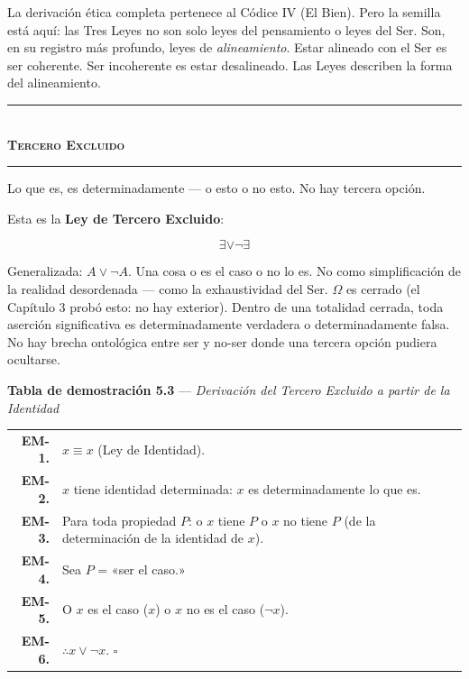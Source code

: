 \documentclass[10pt, openany, oneside]{book}
\renewcommand{\normalsize}{\fontsize{10}{13}\selectfont}
\renewcommand{\footnotesize}{\fontsize{8.5}{11}\selectfont}
\begin{document}
La derivación ética completa pertenece al Códice IV (El Bien). Pero la semilla está aquí: las Tres Leyes no son solo leyes del pensamiento o leyes del Ser. Son, en su registro más profundo, leyes de \textit{alineamiento}. Estar alineado con el Ser es ser coherente. Ser incoherente es estar desalineado. Las Leyes describen la forma del alineamiento.

\vspace{1.5em}


\begin{center}
    \rule{0.3\textwidth}{0.4pt}\\[0.5em]
    {\normalsize\bfseries\scshape Tercero Excluido}\\[0.3em]
    \rule{0.3\textwidth}{0.4pt}
\end{center}

\vspace{1em}

\noindent Lo que es, es determinadamente --- o esto o no esto. No hay tercera opción.

Esta es la \textbf{Ley de Tercero Excluido}:

$$\exists \vee \neg\exists$$

Generalizada: $A \vee \neg A$. Una cosa o es el caso o no lo es. No como simplificación de la realidad desordenada --- como la exhaustividad del Ser. $\Omega$ es cerrado (el Capítulo 3 probó esto: no hay exterior). Dentro de una totalidad cerrada, toda aserción significativa es determinadamente verdadera o determinadamente falsa. No hay brecha ontológica entre ser y no-ser donde una tercera opción pudiera ocultarse.

\vspace{0.5em}

\textbf{Tabla de demostración 5.3} --- \textit{Derivación del Tercero Excluido a partir de la Identidad}

\vspace{0.5em}

{\footnotesize
\noindent\begin{tabular}{r p{}}
\textbf{EM-1.} & $x \equiv x$ (Ley de Identidad). \\[0.3em]
\textbf{EM-2.} & $x$ tiene identidad determinada: $x$ es determinadamente lo que es. \\[0.3em]
\textbf{EM-3.} & Para toda propiedad $P$: o $x$ tiene $P$ o $x$ no tiene $P$ (de la determinación de la identidad de $x$). \\[0.3em]
\textbf{EM-4.} & Sea $P$ = «ser el caso.» \\[0.3em]
\textbf{EM-5.} & O $x$ es el caso ($x$) o $x$ no es el caso ($\neg x$). \\[0.3em]
\textbf{EM-6.} & $\therefore x \vee \neg x$. $\square$ \\[0.3em]
\end{tabular}
}
\end{document}
